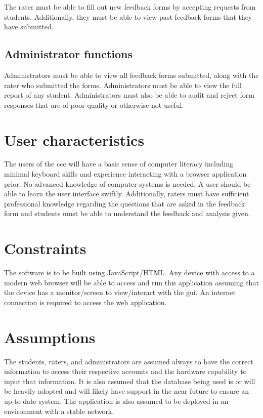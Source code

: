 \documentclass[letterpaper,article,oneside]{memoir}
\begin{document}
The \gls{rater} must be able to fill out new \glspl{feedback form} by accepting requests from \glspl{student}.
Additionally, they must be able to view past \glspl{feedback form} that they have submitted.

\subsection{Administrator functions}

Administrators must be able to view all \glspl{feedback form} submitted, along with the \gls{rater} who submitted the forms.
Administrators must be able to view the full report of any student.
Administrators must also be able to audit and reject \glspl{form response} that are of poor quality or otherwise not useful.

\section{User characteristics}

The \glspl{user} of the \gls{ccc} will have a basic sense of computer literacy including minimal keyboard skills and experience interacting with a browser application prior.
No advanced knowledge of computer systems is needed.
A \gls{user} should be able to learn the \gls{user} interface swiftly.
Additionally, \glspl{rater} must have sufficient professional knowledge regarding the questions that are asked in the feedback form and \glspl{student} must be able to understand the feedback and analysis given.

\section{Constraints}
The software is to be built using JavaScript/HTML.
Any device with access to a modern web browser will be able to access and run this application assuming that the device has a monitor/screen to view/interact with the \gls{gui}.
An internet connection is required to access the web application.

\section{Assumptions}
The \glspl{student}, \glspl{rater}, and administrators are assumed always to have the correct information to access their respective accounts and the hardware capability to input that information.
It is also assumed that the database being used is or will be heavily adopted and will likely have support in the near future to ensure an up-to-date system.
The application is also assumed to be deployed in an environment with a stable network.
\end{document}
